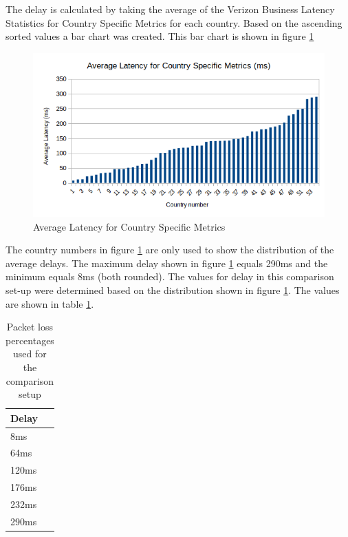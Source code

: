 \documentclass{article}
\begin{document}
The delay is calculated by taking the average of the Verizon Business Latency Statistics for Country Specific Metrics for each country. Based on the ascending sorted values a bar chart was created. This bar chart is shown in figure \ref{fig:verizon-delay-chart}

	\begin{figure}[H] 
		\centering
  			\includegraphics[scale=0.7]{figs/verizon-delay.png}
  			\caption{Average Latency for Country Specific Metrics}
  		\label{fig:verizon-delay-chart}
	\end{figure}
	
The country numbers in figure \ref{fig:verizon-delay-chart} are only used to show the distribution of the average delays. The maximum delay shown in figure \ref{fig:verizon-delay-chart} equals 290ms and the minimum equals 8ms (both rounded). The values for delay in this comparison set-up were determined based on the distribution shown in figure \ref{fig:verizon-delay-chart}. The values are shown in table \ref{table:test-delay}.	
	
	\begin{table}[H]
		\centering
		\caption{Packet loss percentages used for the comparison setup}
		\begin{tabular}[H]{ | l |}
		\hline
		\textbf{Delay} \\
		\hline  8ms\\
		\hline  64ms  \\
		\hline  120ms  \\
		\hline  176ms \\
		\hline	232ms \\
		\hline  290ms  \\
		\hline
		\end{tabular}
		\label{table:test-delay}
	\end{table}
\end{document}
